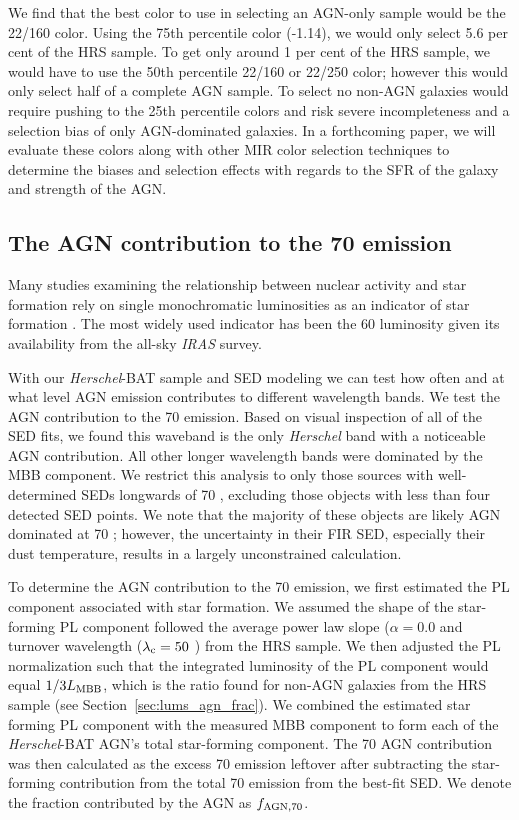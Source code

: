 \documentclass[fleqn, usenatbib]{mnras}
\newcommand{\herschel}{\emph{Herschel}}
\begin{document}
We find that the best color to use in selecting an AGN-only sample would be the 22/160 color. Using the 75th percentile color (-1.14), we would only select 5.6 per cent of the HRS sample. To get only around 1 per cent of the HRS sample, we would have to use the 50th percentile 22/160 or 22/250 color; however this would only select half of a complete AGN sample. To select no non-AGN galaxies would require pushing to the 25th percentile colors and risk severe incompleteness and a selection bias of only AGN-dominated galaxies. In a forthcoming paper, we will evaluate these colors along with other MIR color selection techniques \cite[e.g.][]{Donley:2012qy, Stern:2012mz} to determine the biases and selection effects with regards to the SFR of the galaxy and strength of the AGN.

\subsection{The AGN contribution to the 70 \micron{} emission}\label{sec:agn_70_contribution}
Many studies examining the relationship between nuclear activity and star formation rely on single monochromatic luminosities as an indicator of star formation \cite[e.g.][]{Netzer:2007ve, Netzer:2009lr, Rosario:2012fr}. The most widely used indicator has been the 60 \micron{} luminosity given its availability from the all-sky \textit{IRAS} survey. 

With our \herschel-BAT sample and SED modeling we can test how often and at what level AGN emission contributes to different wavelength bands. We test the AGN contribution to the 70 \micron{} emission. Based on visual inspection of all of the SED fits, we found this waveband is the only \herschel{} band with a noticeable AGN contribution. All other longer wavelength bands were dominated by the MBB component. We restrict this analysis to only those sources with well-determined SEDs longwards of 70 \micron, excluding those objects with less than four detected SED points. We note that the majority of these objects are likely AGN dominated at 70 \micron; however, the uncertainty in their FIR SED, especially their dust temperature, results in a largely unconstrained calculation.

To determine the AGN contribution to the 70 \micron{} emission, we first estimated the PL component associated with star formation. We assumed the shape of the star-forming PL component followed the average power law slope ($\alpha=0.0$ and turnover wavelength ($\lambda_{\rm c} = 50$ \micron) from the HRS sample. We then adjusted the PL normalization such that the integrated luminosity of the PL component would equal $1/3L_{\rm MBB}$, {\color{red}which is the ratio found for non-AGN galaxies from the HRS sample (see Section~\ref{sec:lums_agn_frac})}. We combined the estimated star forming PL component with the measured MBB component to form each of the \herschel-BAT AGN's total star-forming component. The 70 \micron{} AGN contribution was then calculated as the excess 70 \micron{} emission leftover after subtracting the star-forming contribution from the total 70 \micron{} emission from the best-fit SED. We denote the fraction contributed by the AGN as $f_{\rm AGN, 70}$.
\end{document}
